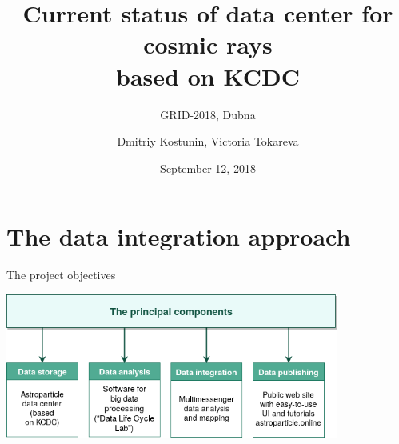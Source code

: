 \documentclass[18pt]{beamer}
\title[Cosmic rays data center]{Current status of data center for cosmic rays \\based on KCDC}
\subtitle{GRID-2018, Dubna}
\author{Dmitriy Kostunin, Victoria Tokareva}
\institute{Institute for Nuclear Physics (IKP)}
\date{September 12, 2018}
\begin{document}



\section{The data integration approach}

\begin{frame}{The project objectives}

\vspace{-1.5em}
\begin{center}
\includegraphics[width=0.82\textwidth]{pics/proj_objectives.png}
\end{center}

\end{frame}
\end{document}
